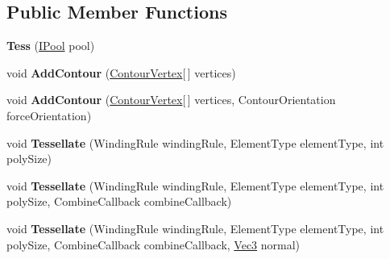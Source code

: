 \subsection*{Public Member Functions}
\begin{DoxyCompactItemize}
\item 
\mbox{\label{class_super_tiled2_unity_1_1_editor_1_1_lib_tess_dot_net_1_1_tess_a40b858b7f3c13f2eeff0f8ecd420dcef}} 
{\bfseries Tess} (\mbox{\hyperlink{class_super_tiled2_unity_1_1_editor_1_1_lib_tess_dot_net_1_1_i_pool}{I\+Pool}} pool)
\item 
\mbox{\label{class_super_tiled2_unity_1_1_editor_1_1_lib_tess_dot_net_1_1_tess_a2c7312adccd2c464fbd4b86e6a562047}} 
void {\bfseries Add\+Contour} (\mbox{\hyperlink{struct_super_tiled2_unity_1_1_editor_1_1_lib_tess_dot_net_1_1_contour_vertex}{Contour\+Vertex}}\mbox{[}$\,$\mbox{]} vertices)
\item 
\mbox{\label{class_super_tiled2_unity_1_1_editor_1_1_lib_tess_dot_net_1_1_tess_a5e8432a57b71e7c9a99a6b72c6bb2b75}} 
void {\bfseries Add\+Contour} (\mbox{\hyperlink{struct_super_tiled2_unity_1_1_editor_1_1_lib_tess_dot_net_1_1_contour_vertex}{Contour\+Vertex}}\mbox{[}$\,$\mbox{]} vertices, Contour\+Orientation force\+Orientation)
\item 
\mbox{\label{class_super_tiled2_unity_1_1_editor_1_1_lib_tess_dot_net_1_1_tess_afe9b67cc89f9ee8c6abd678759f2b450}} 
void {\bfseries Tessellate} (Winding\+Rule winding\+Rule, Element\+Type element\+Type, int poly\+Size)
\item 
\mbox{\label{class_super_tiled2_unity_1_1_editor_1_1_lib_tess_dot_net_1_1_tess_a28b2a3a23b91b06c15e265d9cd7b6eb0}} 
void {\bfseries Tessellate} (Winding\+Rule winding\+Rule, Element\+Type element\+Type, int poly\+Size, Combine\+Callback combine\+Callback)
\item 
\mbox{\label{class_super_tiled2_unity_1_1_editor_1_1_lib_tess_dot_net_1_1_tess_aa2c0d88bbb370249a93babac320f626b}} 
void {\bfseries Tessellate} (Winding\+Rule winding\+Rule, Element\+Type element\+Type, int poly\+Size, Combine\+Callback combine\+Callback, \mbox{\hyperlink{struct_super_tiled2_unity_1_1_editor_1_1_lib_tess_dot_net_1_1_vec3}{Vec3}} normal)
\end{DoxyCompactItemize}
